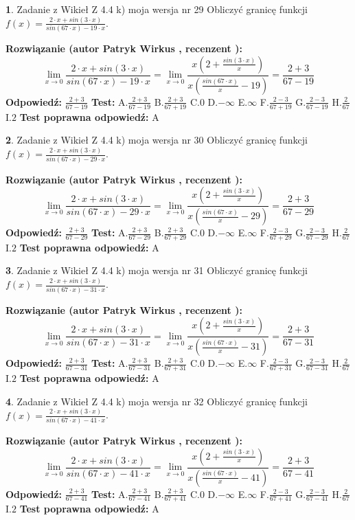 \documentclass[12pt, a4paper]{article}
\theoremstyle{definition} %
\newtheorem{zad}{}
\newcommand{\zadStart}[1]{\begin{zad}#1\newline}
\newcommand{\zadStop}{\end{zad}}
\newcommand{\rozwStart}[2]{\noindent \textbf{Rozwiązanie (autor #1 , recenzent #2): }\newline}
\newcommand{\rozwStop}{\newline}
\newcommand{\odpStart}{\noindent \textbf{Odpowiedź:}\newline}
\newcommand{\odpStop}{\newline}
\newcommand{\testStart}{\noindent \textbf{Test:}\newline}
\newcommand{\testStop}{\newline}
\newcommand{\kluczStart}{\noindent \textbf{Test poprawna odpowiedź:}\newline}
\newcommand{\kluczStop}{\newline}
\begin{document}
\zadStart{Zadanie z Wikieł Z 4.4 k) moja wersja nr 29}
Obliczyć granicę funkcji $f(x)=\frac{2\cdot x +sin(3\cdot x)}{sin(67\cdot x) -19\cdot x}$.
\zadStop
\rozwStart{Patryk Wirkus}{}
$$\lim\limits_{x\to 0}\frac{2\cdot x +sin(3\cdot x)}{sin(67\cdot x) -19\cdot x}
=\lim\limits_{x\to 0}\frac{x(2+\frac{sin(3\cdot x)}{x})}{x(\frac{sin(67\cdot x)}{x}-19)}
=\frac{2+3}{67-19}$$
\rozwStop
\odpStart
$\frac{2+3}{67-19}$
\odpStop
\testStart
A.$\frac{2+3}{67-19}$
B.$\frac{2+3}{67+19}$
C.$0$
D.$-\infty$
E.$\infty$
F.$\frac{2-3}{67+19}$
G.$\frac{2-3}{67-19}$
H.$\frac{2}{67}$
I.$2$
\testStop
\kluczStart
A
\kluczStop



\zadStart{Zadanie z Wikieł Z 4.4 k) moja wersja nr 30}
Obliczyć granicę funkcji $f(x)=\frac{2\cdot x +sin(3\cdot x)}{sin(67\cdot x) -29\cdot x}$.
\zadStop
\rozwStart{Patryk Wirkus}{}
$$\lim\limits_{x\to 0}\frac{2\cdot x +sin(3\cdot x)}{sin(67\cdot x) -29\cdot x}
=\lim\limits_{x\to 0}\frac{x(2+\frac{sin(3\cdot x)}{x})}{x(\frac{sin(67\cdot x)}{x}-29)}
=\frac{2+3}{67-29}$$
\rozwStop
\odpStart
$\frac{2+3}{67-29}$
\odpStop
\testStart
A.$\frac{2+3}{67-29}$
B.$\frac{2+3}{67+29}$
C.$0$
D.$-\infty$
E.$\infty$
F.$\frac{2-3}{67+29}$
G.$\frac{2-3}{67-29}$
H.$\frac{2}{67}$
I.$2$
\testStop
\kluczStart
A
\kluczStop



\zadStart{Zadanie z Wikieł Z 4.4 k) moja wersja nr 31}
Obliczyć granicę funkcji $f(x)=\frac{2\cdot x +sin(3\cdot x)}{sin(67\cdot x) -31\cdot x}$.
\zadStop
\rozwStart{Patryk Wirkus}{}
$$\lim\limits_{x\to 0}\frac{2\cdot x +sin(3\cdot x)}{sin(67\cdot x) -31\cdot x}
=\lim\limits_{x\to 0}\frac{x(2+\frac{sin(3\cdot x)}{x})}{x(\frac{sin(67\cdot x)}{x}-31)}
=\frac{2+3}{67-31}$$
\rozwStop
\odpStart
$\frac{2+3}{67-31}$
\odpStop
\testStart
A.$\frac{2+3}{67-31}$
B.$\frac{2+3}{67+31}$
C.$0$
D.$-\infty$
E.$\infty$
F.$\frac{2-3}{67+31}$
G.$\frac{2-3}{67-31}$
H.$\frac{2}{67}$
I.$2$
\testStop
\kluczStart
A
\kluczStop



\zadStart{Zadanie z Wikieł Z 4.4 k) moja wersja nr 32}
Obliczyć granicę funkcji $f(x)=\frac{2\cdot x +sin(3\cdot x)}{sin(67\cdot x) -41\cdot x}$.
\zadStop
\rozwStart{Patryk Wirkus}{}
$$\lim\limits_{x\to 0}\frac{2\cdot x +sin(3\cdot x)}{sin(67\cdot x) -41\cdot x}
=\lim\limits_{x\to 0}\frac{x(2+\frac{sin(3\cdot x)}{x})}{x(\frac{sin(67\cdot x)}{x}-41)}
=\frac{2+3}{67-41}$$
\rozwStop
\odpStart
$\frac{2+3}{67-41}$
\odpStop
\testStart
A.$\frac{2+3}{67-41}$
B.$\frac{2+3}{67+41}$
C.$0$
D.$-\infty$
E.$\infty$
F.$\frac{2-3}{67+41}$
G.$\frac{2-3}{67-41}$
H.$\frac{2}{67}$
I.$2$
\testStop
\kluczStart
A
\kluczStop
\end{document}
